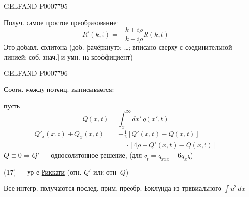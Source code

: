 \begin{GelfandAdjacentEvidence}{GELFAND-P000779}{5}


Получ. самое простое преобразование:
\begin{equation}
R'(k,t)=-\frac{k+i\rho}{k-i\rho}R(k,t)\tag{15}
\end{equation}
Это добавл. солитона (доб. [зачёркнуто: …; вписано сверху с соединительной линией: соб. знач.] и умн. на коэффициент)

\end{GelfandAdjacentEvidence}
\begin{GelfandAdjacentEvidence}{GELFAND-P000779}{6}


Соотн. между потенц. выписывается:

пусть
\begin{equation}
Q(x,t)=\int_x^\infty dx'\,q(x',t)\tag{16}
\end{equation}
\begin{equation}
\begin{split}
Q'_x(x,t)+Q_x(x,t)={}&-\tfrac12[Q'(x,t)-Q(x,t)]\\
&\quad\cdot[4\rho+Q'(x,t)-Q(x,t)]
\end{split}\tag{17}
\end{equation}
\(Q\equiv0\Rightarrow Q'\) --- односолитонное решение, (для \(q_t=q_{xxx}-6q_xq\))

(17) --- ур-е \underline{Риккати} (отн. \(Q'\) или отн. \(Q\))

Все интегр. получаются послед. прим. преобр. Бэклунда из тривиального \(\int u^2\,dx\)


\end{GelfandAdjacentEvidence}

